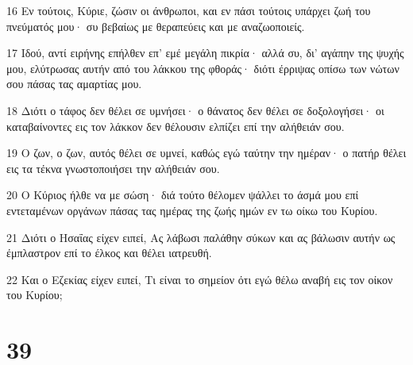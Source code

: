 \par 16 Εν τούτοις, Κύριε, ζώσιν οι άνθρωποι, και εν πάσι τούτοις υπάρχει ζωή του πνεύματός μου· συ βεβαίως με θεραπεύεις και με αναζωοποιείς.
\par 17 Ιδού, αντί ειρήνης επήλθεν επ' εμέ μεγάλη πικρία· αλλά συ, δι' αγάπην της ψυχής μου, ελύτρωσας αυτήν από του λάκκου της φθοράς· διότι έρριψας οπίσω των νώτων σου πάσας τας αμαρτίας μου.
\par 18 Διότι ο τάφος δεν θέλει σε υμνήσει· ο θάνατος δεν θέλει σε δοξολογήσει· οι καταβαίνοντες εις τον λάκκον δεν θέλουσιν ελπίζει επί την αλήθειάν σου.
\par 19 Ο ζων, ο ζων, αυτός θέλει σε υμνεί, καθώς εγώ ταύτην την ημέραν· ο πατήρ θέλει εις τα τέκνα γνωστοποιήσει την αλήθειάν σου.
\par 20 Ο Κύριος ήλθε να με σώση· διά τούτο θέλομεν ψάλλει το άσμά μου επί εντεταμένων οργάνων πάσας τας ημέρας της ζωής ημών εν τω οίκω του Κυρίου.
\par 21 Διότι ο Ησαΐας είχεν ειπεί, Ας λάβωσι παλάθην σύκων και ας βάλωσιν αυτήν ως έμπλαστρον επί το έλκος και θέλει ιατρευθή.
\par 22 Και ο Εζεκίας είχεν ειπεί, Τι είναι το σημείον ότι εγώ θέλω αναβή εις τον οίκον του Κυρίου;

\chapter{39}

